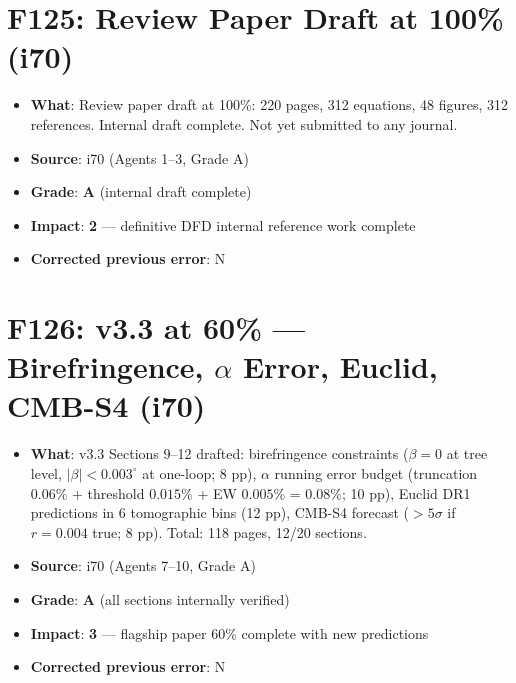 \documentclass[11pt,a4paper]{article}
\newcommand{\grade}[1]{\textbf{#1}}
\newcommand{\impact}[1]{\textbf{#1}}
\begin{document}
\section{F125: Review Paper Draft at 100\% (i70)}
\begin{itemize}[nosep]
\item \textbf{What}: Review paper draft at 100\%: 220 pages, 312 equations, 48 figures, 312 references. Internal draft complete. Not yet submitted to any journal.
\item \textbf{Source}: i70 (Agents 1--3, Grade A)
\item \textbf{Grade}: \grade{A} (internal draft complete)
\item \textbf{Impact}: \impact{2} --- definitive DFD internal reference work complete
\item \textbf{Corrected previous error}: N
\end{itemize}

\section{F126: v3.3 at 60\% --- Birefringence, $\alpha$ Error, Euclid, CMB-S4 (i70)}
\begin{itemize}[nosep]
\item \textbf{What}: v3.3 Sections 9--12 drafted: birefringence constraints ($\beta = 0$ at tree level, $|\beta| < 0.003^\circ$ at one-loop; 8 pp), $\alpha$ running error budget (truncation $0.06\%$ + threshold $0.015\%$ + EW $0.005\%$ = $0.08\%$; 10 pp), Euclid DR1 predictions in 6 tomographic bins (12 pp), CMB-S4 forecast ($>5\sigma$ if $r = 0.004$ true; 8 pp). Total: 118 pages, 12/20 sections.
\item \textbf{Source}: i70 (Agents 7--10, Grade A)
\item \textbf{Grade}: \grade{A} (all sections internally verified)
\item \textbf{Impact}: \impact{3} --- flagship paper 60\% complete with new predictions
\item \textbf{Corrected previous error}: N
\end{itemize}

\end{document}
